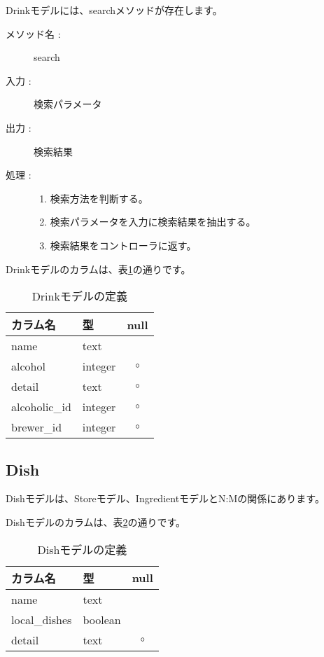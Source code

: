 \documentclass[a4j,titlepage]{jarticle}
\begin{document}
Drinkモデルには、searchメソッドが存在します。

\begin{description}
\item [メソッド名 :] search
\item [入力 :] 検索パラメータ
\item [出力 :] 検索結果
\item [処理 :]\mbox{}
  \begin{enumerate}
  \item 検索方法を判断する。
  \item 検索パラメータを入力に検索結果を抽出する。
  \item 検索結果をコントローラに返す。
  \end{enumerate}
\end{description}

Drinkモデルのカラムは、表\ref{drink}の通りです。

\begin{table}[!htbp]
\caption{Drinkモデルの定義}
\label{drink}
\small
\begin{center}
\begin{tabular}{|l|l|c|}\hline
カラム名 & 型 & null \\\hline\hline
name & text & \\\hline
alcohol & integer & $\circ$ \\\hline
detail & text & $\circ$ \\\hline
alcoholic\_id & integer & $\circ$ \\\hline
brewer\_id & integer & $\circ$ \\\hline
\end{tabular}
\end{center}
\end{table}

\subsection{Dish}
Dishモデルは、Storeモデル、IngredientモデルとN:Mの関係にあります。

Dishモデルのカラムは、表\ref{dish}の通りです。

\begin{table}[!htbp]
\caption{Dishモデルの定義}
\label{dish}
\small
\begin{center}
\begin{tabular}{|l|l|c|}\hline
カラム名 & 型 & null \\\hline\hline
name & text & \\\hline
local\_dishes & boolean & \\\hline
detail & text & $\circ$ \\\hline
\end{tabular}
\end{center}
\end{table}
\end{document}
